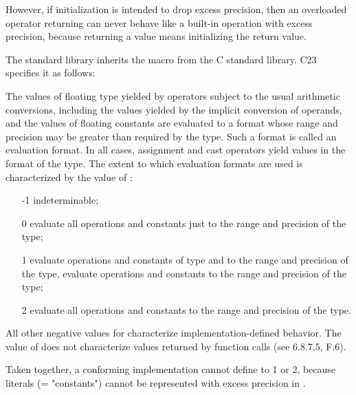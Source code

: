 However, if initialization is intended to drop excess precision, then an
overloaded operator returning \float can never behave like a built-in operation
with excess precision, because returning a value means initializing the return
value.

The \CC{} standard library inherits the  macro from the C
standard library. C23 specifies it as follows:

\begin{wgText}
  \setcounter{Paras}{25}\pnum
  The values of floating type yielded by operators subject to the usual
  arithmetic conversions, including the values yielded by the implicit
  conversion of operands, and the values of floating constants are evaluated to
  a format whose range and precision may be greater than required by the type.
  Such a format is called an evaluation format.
  In all cases, assignment and cast operators yield values in the format of the
  type.
  The extent to which evaluation formats are used is characterized by the value
  of :
  \begin{itemize}
    \item [-1] indeterminable;

    \item [0] evaluate all operations and constants just to the range and
      precision of the type;

    \item [1] evaluate operations and constants of type \float and \double to
      the range and precision of the \double type, evaluate 
      operations and constants to the range and precision of the  type;

    \item [2] evaluate all operations and constants to the range and precision
      of the  type.
  \end{itemize}
  All other negative values for  characterize
  implementation-defined behavior.
  The value of  does not characterize values returned by
  function calls (see 6.8.7.5, F.6).
\end{wgText}

Taken together, a conforming \CC{} implementation cannot define
 to 1 or 2, because literals (= "constants") cannot be
represented with excess precision in \CC{}.

